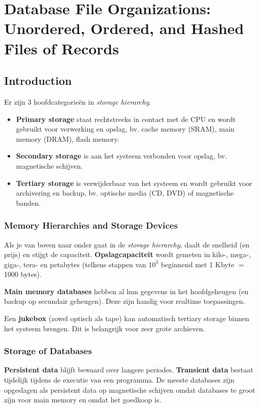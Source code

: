 \chapter{Database File Organizations: Unordered, Ordered, and Hashed Files of Records}
\section{Introduction}
Er zijn 3 hoofdcategorie\"en in \textit{storage hierarchy}. 
\begin{itemize}
	\item \textbf{Primary storage} staat rechtstreeks in contact met de CPU en wordt gebruikt voor verwerking en opslag, bv. cache memory (SRAM), main memory (DRAM), flash memory.
	\item \textbf{Secondary storage} is aan het systeem verbonden voor opslag, bv. magnetische schijven.
	\item \textbf{Tertiary storage} is verwijderbaar van het systeem en wordt gebruikt voor archivering en backup, bv. optische media (CD, DVD) of magnetische banden.
\end{itemize}


\subsection{Memory Hierarchies and Storage Devices}
Als je van boven naar onder gaat in de \textit{storage hierarchy}, daalt de snelheid (en prijs) en stijgt de capaciteit. \textbf{Opslagcapaciteit} wordt gemeten in kilo-, mega-, giga-, tera- en petabytes (telkens stappen van $10^3$ beginnend met 1 Kbyte $=$ 1000 bytes).

\textbf{Main memory databases} hebben al hun gegevens in het hoofdgeheugen (en backup op secundair geheugen). Deze zijn handig voor realtime toepassingen.

Een \textbf{jukebox} (zowel optisch als tape) kan automatisch tertiary storage binnen het systeem brengen. Dit is belangrijk voor zeer grote archieven.


\subsection{Storage of Databases}
\textbf{Persistent data} blijft bewaard over langere periodes. \textbf{Transient data} bestaat tijdelijk tijdens de executie van een programma. De meeste databases zijn opgeslagen als persistent data op magnetische schijven omdat databases te groot zijn voor main memory en omdat het goedkoop is.

